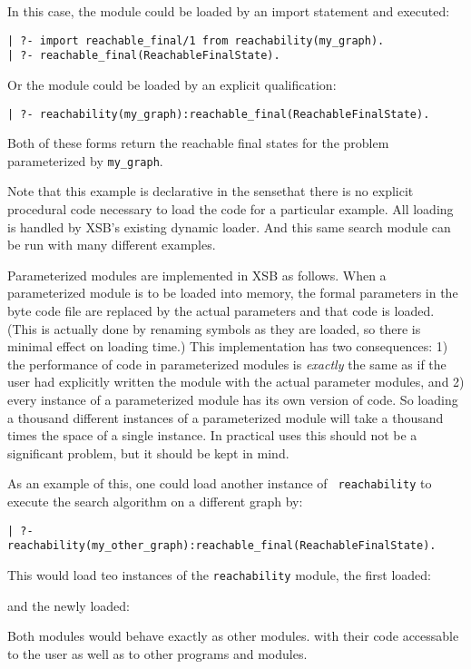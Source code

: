 In this case, the module could be loaded by an import statement and
executed:
\begin{verbatim}
| ?- import reachable_final/1 from reachability(my_graph).
| ?- reachable_final(ReachableFinalState).
\end{verbatim}
Or the module could be loaded by an explicit qualification:
\begin{verbatim}
| ?- reachability(my_graph):reachable_final(ReachableFinalState).
\end{verbatim}
Both of these forms return the reachable final states for the problem
parameterized by {\tt my\_graph}.

Note that this example is declarative in the sensethat there is no
explicit procedural code necessary to load the code for a particular
example.  All loading is handled by XSB's existing dynamic loader.
And this same search module can be run with many different examples.

Parameterized modules are implemented in XSB as follows.  When a
parameterized module is to be loaded into memory, the formal
parameters in the byte code file are replaced by the actual parameters
and that code is loaded.  (This is actually done by renaming symbols
as they are loaded, so there is minimal effect on loading time.)  This
implementation has two consequences: 1) the performance of code in
parameterized modules is {\em exactly} the same as if the user had
explicitly written the module with the actual parameter modules, and
2) every instance of a parameterized module has its own version of
code.  So loading a thousand different instances of a parameterized
module will take a thousand times the space of a single instance.  In
practical uses
this should not be a significant problem, but it should be kept in
mind.

As an example of this, one could load another instance of {\tt
  reachability} to execute the search algorithm on a different graph
by:
\begin{verbatim}
| ?- reachability(my_other_graph):reachable_final(ReachableFinalState).
\end{verbatim}
This would load teo instances of the {\tt reachability} module, the
first loaded:


\noindent
and the newly loaded:


\noindent
Both modules would behave exactly as other modules. with their code
accessable to the user as well as to other programs and modules.

